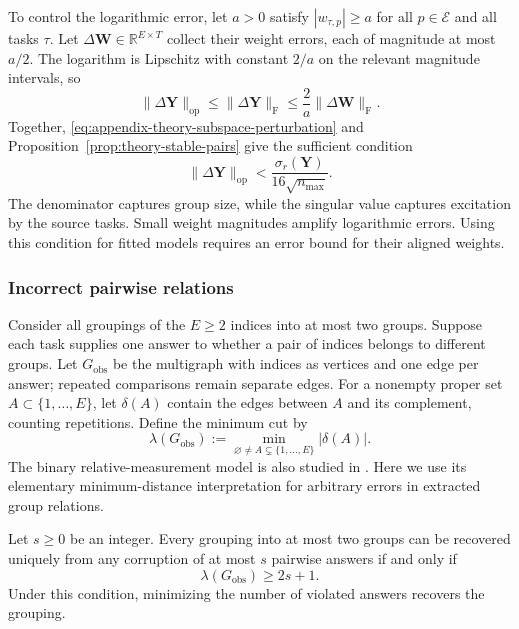 To control the logarithmic error, let $a>0$ satisfy
$|w_{\tau,p}|\ge a$ for all $p\in\mathcal E$ and all tasks $\tau$.
Let $\Delta\mathbf W\in\mathbb R^{E\times T}$
collect their weight errors, each of magnitude at most $a/2$.
The logarithm is Lipschitz with constant $2/a$ on the relevant
magnitude intervals, so
\begin{equation}
    \|\Delta\mathbf Y\|_{\mathrm{op}}
    \le\|\Delta\mathbf Y\|_{\mathrm F}
    \le\frac2a\|\Delta\mathbf W\|_{\mathrm F}.
    \label{eq:appendix-theory-log-error}
\end{equation}
Together, \eqref{eq:appendix-theory-subspace-perturbation} and
Proposition~\ref{prop:theory-stable-pairs} give the sufficient
condition
\begin{equation*}
    \|\Delta\mathbf Y\|_{\mathrm{op}}
    <\frac{\sigma_r(\mathbf Y)}{16\sqrt{n_{\max}}}.
\end{equation*}
The denominator captures group size, while the singular value
captures excitation by the source tasks.
Small weight magnitudes amplify logarithmic errors.
Using this condition for fitted models requires an error bound
for their aligned weights.

\subsubsection{Incorrect pairwise relations}
\label{app:theory-partial-noise}

Consider all groupings of the $E\ge2$ indices into at most two
groups. Suppose each task supplies one answer to whether a pair
of indices belongs to different groups.
Let $G_{\mathrm{obs}}$ be the multigraph with indices as vertices
and one edge per answer; repeated comparisons remain separate edges.
For a nonempty proper set $A\subset\{1,\ldots,E\}$, let
$\delta(A)$ contain the edges between $A$ and its complement,
counting repetitions. Define the minimum cut by
$$
    \lambda(G_{\mathrm{obs}})
        :=\min_{\varnothing\ne A\subsetneq\{1,\ldots,E\}}
                     |\delta(A)|.
$$
The binary relative-measurement model is also studied in
\citet{abbe2014decoding}. Here we use its elementary minimum-distance
interpretation for arbitrary errors in extracted group relations.

\begin{proposition}
    \label{prop:theory-partial-error-correction}
    Let $s\ge0$ be an integer.
    Every grouping into at most two groups can be recovered
    uniquely from any corruption of at most $s$ pairwise answers
    if and only if
    \begin{equation}
        \lambda(G_{\mathrm{obs}})\ge2s+1.
        \label{eq:appendix-theory-cut-correction}
    \end{equation}
    Under this condition, minimizing the number of violated
    answers recovers the grouping.
\end{proposition}

